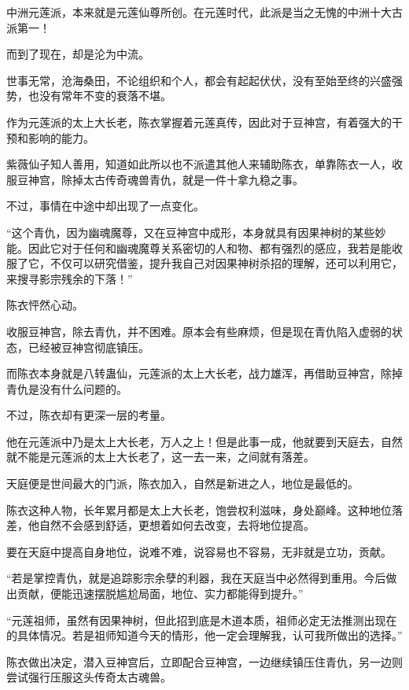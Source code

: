 
\begin{this_body}



中洲元莲派，本来就是元莲仙尊所创。在元莲时代，此派是当之无愧的中洲十大古派第一！

而到了现在，却是沦为中流。

世事无常，沧海桑田，不论组织和个人，都会有起起伏伏，没有至始至终的兴盛强势，也没有常年不变的衰落不堪。

作为元莲派的太上大长老，陈衣掌握着元莲真传，因此对于豆神宫，有着强大的干预和影响的能力。

紫薇仙子知人善用，知道如此所以也不派遣其他人来辅助陈衣，单靠陈衣一人，收服豆神宫，除掉太古传奇魂兽青仇，就是一件十拿九稳之事。

不过，事情在中途中却出现了一点变化。

“这个青仇，因为幽魂魔尊，又在豆神宫中成形，本身就具有因果神树的某些妙能。因此它对于任何和幽魂魔尊关系密切的人和物、都有强烈的感应，我若是能收服了它，不仅可以研究借鉴，提升我自己对因果神树杀招的理解，还可以利用它，来搜寻影宗残余的下落！”

陈衣怦然心动。

收服豆神宫，除去青仇，并不困难。原本会有些麻烦，但是现在青仇陷入虚弱的状态，已经被豆神宫彻底镇压。

而陈衣本身就是八转蛊仙，元莲派的太上大长老，战力雄浑，再借助豆神宫，除掉青仇是没有什么问题的。

不过，陈衣却有更深一层的考量。

他在元莲派中乃是太上大长老，万人之上！但是此事一成，他就要到天庭去，自然就不能是元莲派的太上大长老了，这一去一来，之间就有落差。

天庭便是世间最大的门派，陈衣加入，自然是新进之人，地位是最低的。

陈衣这种人物，长年累月都是太上大长老，饱尝权利滋味，身处巅峰。这种地位落差，他自然不会感到舒适，更想着如何去改变，去将地位提高。

要在天庭中提高自身地位，说难不难，说容易也不容易，无非就是立功，贡献。

“若是掌控青仇，就是追踪影宗余孽的利器，我在天庭当中必然得到重用。今后做出贡献，便能迅速摆脱尴尬局面，地位、实力都能得到提升。”

“元莲祖师，虽然有因果神树，但此招到底是木道本质，祖师必定无法推测出现在的具体情况。若是祖师知道今天的情形，他一定会理解我，认可我所做出的选择。”

陈衣做出决定，潜入豆神宫后，立即配合豆神宫，一边继续镇压住青仇，另一边则尝试强行压服这头传奇太古魂兽。


\end{this_body}
